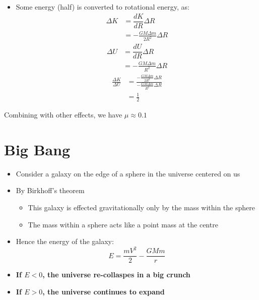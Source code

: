 \documentclass{article}
\begin{document}
\begin{itemize}
\begin{itemize}
\begin{itemize}
\item Some energy (half) is converted to rotational energy, as:
\begin{align}
\Delta K& =\dfrac{dK}{dR} \Delta R\\
&=-\frac{GM\Delta m}{2R^2} \Delta R
\end{align}
\begin{align}
\Delta U& =\dfrac{dU}{dR} \Delta R\\
&=-\frac{GM\Delta m}{R^2} \Delta R
\end{align}
\begin{align}
\frac{\Delta K}{\Delta U}&=\frac{-\frac{GM\Delta m}{2R^2} \Delta R}{-\frac{GM\Delta m}{R^2} \Delta R}\\
&=\frac{1}{2}
\end{align}
\end{itemize}
\end{itemize}
Combining with other effects, we have $\mu \approx 0.1$
\end{itemize}
\section{Big Bang}
\begin{itemize}
\item Consider a galaxy on the edge of a sphere in the universe centered on us
\item By Birkhoff's theorem
\begin{itemize}
    \item This galaxy is effected gravitationally only by the mass within the sphere
    \item The mass within a sphere acts like a point mass at the centre
\end{itemize}
\item Hence the energy of the galaxy:
\begin{equation}
    E=\frac{mV^2}{2}-\frac{GMm}{r}
\end{equation}
\item \textbf{If $E<0$, the universe re-collaspes in a big crunch}
\item \textbf{If $E>0$, the universe continues to expand}
\end{itemize}
\end{document}
